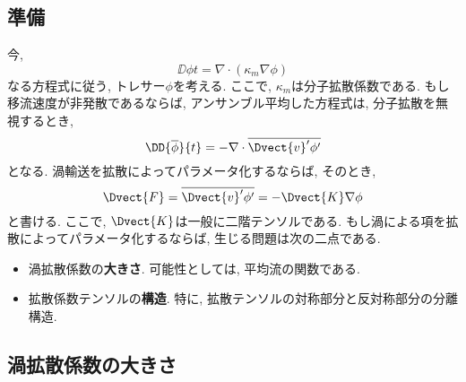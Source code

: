 \subsection{準備}
今, 
\begin{equation}
  \DD{\phi}{t} = \nabla \cdot (\kappa_m \nabla \phi)
\end{equation}
なる方程式に従う, トレサー$\phi$を考える. 
ここで, $\kappa_m$は分子拡散係数である. 
もし移流速度が非発散であるならば, アンサンブル平均した方程式は, 
分子拡散を無視するとき, 
\begin{equation}
  \DD{\overline{\phi}}{t} = - \nabla \cdot \overline{\Dvect{v}' \phi'}
\end{equation}
となる. 
渦輸送を拡散によってパラメータ化するならば, そのとき, 
\begin{equation}
  \Dvect{F} = \overline{\Dvect{v}' \phi'}
            = - \Dvect{K} \nabla \phi
\end{equation}
と書ける. 
ここで, $\Dvect{K}$は一般に二階テンソルである. 
もし渦による項を拡散によってパラメータ化するならば, 
生じる問題は次の二点である. 
\begin{itemize}
 \item 渦拡散係数の\textbf{大きさ}. 可能性としては, 平均流の関数である. 
 \item 拡散係数テンソルの\textbf{構造}. 特に, 拡散テンソルの対称部分と反対称部分の分離構造. 
\end{itemize}

\subsection{渦拡散係数の大きさ}

